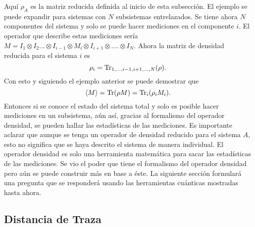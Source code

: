 Aquí $\rho_{A}$ es la matriz reducida definida al inicio de esta subsección. El ejemplo se puede expandir para sistemas con $N$ subsistemas entrelazados. Se tiene ahora $N$ componentes del sistema y solo se puede hacer mediciones en el componente $i$. El operador que describe estas mediciones sería $M= I_{1}\otimes I_{2} ... \otimes I_{i-1} \otimes M_{i} \otimes I_{i+1}\otimes .... \otimes I_{N}$. Ahora la matriz de densidad reducida para el sistema $i$ es
\begin{equation}
\rho_{i}= \Tr_{1,...,i-1,i+1,...,N}(\rho).
\end{equation}
Con esto y siguiendo el ejemplo anterior se puede demostrar que  \cite{Decoherence}
\begin{equation}
\langle M \rangle = \Tr(\rho M)=\Tr_{i}(\rho_{i} M_{i}).
\end{equation}
Entonces si se conoce el estado del sistema total y solo es posible hacer mediciones en un subsistema, aún así, gracias al formalismo del operador densidad, se pueden hallar las estadísticas de las mediciones. Es importante aclarar que aunque se tenga un operador de densidad reducido para el sistema $A$, esto no significa que se haya descrito el sistema de manera individual. El operador densidad es solo una herramienta matemática para sacar las estadísticas de las mediciones. Se vio el poder que tiene el formalismo del operador densidad pero aún se puede construir más en base a éste. La siguiente sección formulará una pregunta que se responderá usando las herramientas cuánticas mostradas hasta ahora.
\subsection{Distancia de Traza}

